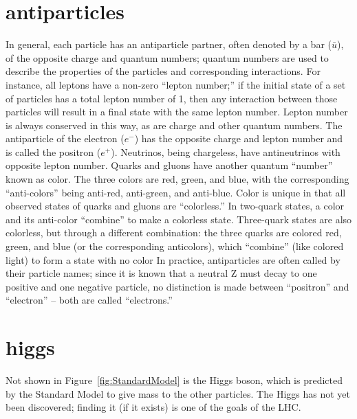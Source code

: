 \section{antiparticles}
In general, each particle has an antiparticle partner, 
often denoted by a bar ($\bar{u}$), 
of the opposite charge and quantum numbers; %
quantum numbers are used to describe the properties of the particles 
and corresponding interactions.  
For instance, all leptons have a non-zero ``lepton number;'' 
if the initial state of a set of particles 
has a total lepton number of 1, 
then any interaction between those particles will 
result in a final state with the same lepton number.  
Lepton number is always conserved in this way, 
as are charge and other quantum numbers.  
The antiparticle of the electron ($e^-$) 
has the opposite charge and lepton number 
and is called the positron ($e^+$).  
Neutrinos, being chargeless, 
have antineutrinos with opposite lepton number.  %
Quarks and gluons have another quantum ``number'' known as color.   %
The three colors are red, green, and blue, with the corresponding 
``anti-colors'' being anti-red, anti-green, and anti-blue.  
Color is unique in that all observed states of quarks and gluons 
are ``colorless.''
In two-quark states, a color and its anti-color ``combine'' to make a colorless state.  
Three-quark states are also colorless, but through a different combination: 
the three quarks are colored red, green, and blue 
(or the corresponding anticolors), which ``combine'' (like colored light) to form 
a state with no color
In practice, antiparticles are often called by their particle names; 
since it is known that a neutral Z must decay to one positive and one negative 
particle, no distinction is made between ``positron'' and ``electron'' -- 
both are called ``electrons.''  

\section{higgs}  
Not shown in Figure~\ref{fig:StandardModel} is the Higgs boson, 
which is predicted by the Standard Model 
to give mass to the other particles.  
The Higgs has not yet been discovered; 
finding it (if it exists) is one of the 
goals of the LHC.  


